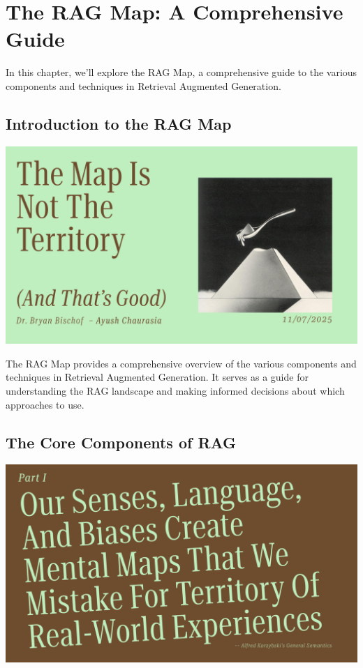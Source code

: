 \documentclass[
  letterpaper,
  oneside]{scrbook}
\begin{document}
\chapter{The RAG Map: A Comprehensive
Guide}\label{the-rag-map-a-comprehensive-guide-1}

In this chapter, we'll explore the RAG Map, a comprehensive guide to the
various components and techniques in Retrieval Augmented Generation.

\section{Introduction to the RAG Map}\label{introduction-to-the-rag-map}

\includegraphics{chapters/../p5-images/slide_1.png}

The RAG Map provides a comprehensive overview of the various components
and techniques in Retrieval Augmented Generation. It serves as a guide
for understanding the RAG landscape and making informed decisions about
which approaches to use.

\section{The Core Components of RAG}\label{the-core-components-of-rag}

\includegraphics{chapters/../p5-images/slide_2.png}
\end{document}
